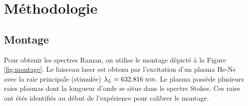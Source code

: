 \documentclass[10pt,letterpaper,twocolumn]{article}
\newcommand{\s}{\hspace{0.1cm}}
\begin{document}
\section{Méthodologie}\label{sec:metho} %

\subsection{Montage}
Pour obtenir les spectres Raman, on utilise le montage dépicté à la Figure \ref{fig:montage}. Le faisceau laser est obtenu par l'excitation d'un plasma He-Ne avec la raie principale (stimulée) ${\lambda_L = 632.816\s nm}$. Le plasma possède plusieurs raies plasmas dont la longueur d'onde se situe dans le spectre Stokes. Ces raies ont étés identifiés au début de l'expérience pour calibrer le montage. \par
\end{document}

